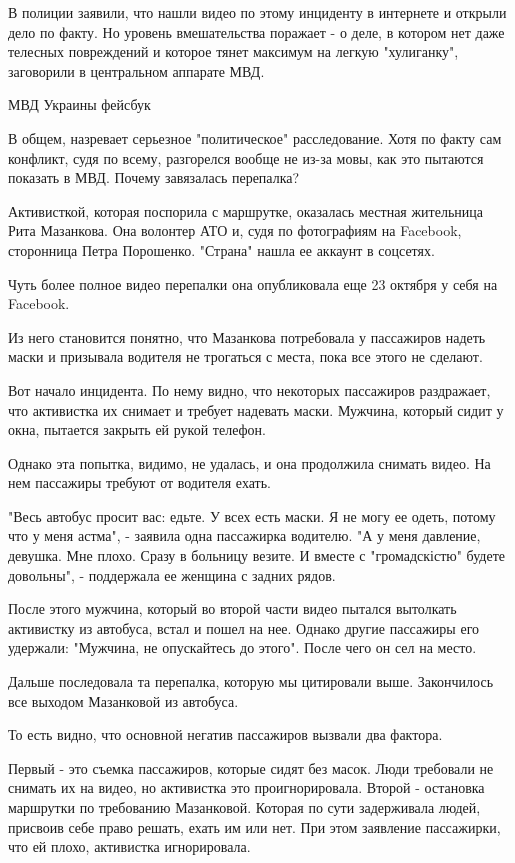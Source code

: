 В полиции заявили, что нашли видео по этому инциденту в интернете и открыли дело по факту. Но уровень вмешательства поражает - о деле, в котором нет даже телесных повреждений и которое тянет максимум на легкую "хулиганку", заговорили в центральном аппарате МВД.

МВД Украины фейсбук

В общем, назревает серьезное "политическое" расследование. Хотя по факту сам конфликт, судя по всему, разгорелся вообще не из-за мовы, как это пытаются показать в МВД. 
Почему завязалась перепалка?

Активисткой, которая поспорила с маршрутке, оказалась местная жительница Рита Мазанкова. Она волонтер АТО и, судя по фотографиям на Facebook, сторонница Петра Порошенко. "Страна" нашла ее аккаунт в соцсетях. 

Чуть более полное видео перепалки она опубликовала еще 23 октября у себя на Facebook.

Из него становится понятно, что Мазанкова потребовала у пассажиров надеть маски
и призывала водителя не трогаться с места, пока все этого не сделают.

Вот начало инцидента. По нему видно, что некоторых пассажиров раздражает, что активистка их снимает и требует надевать маски. Мужчина, который сидит у окна, пытается закрыть ей рукой телефон. 

Однако эта попытка, видимо, не удалась, и она продолжила снимать видео. На нем
пассажиры требуют от водителя ехать. 

"Весь автобус просит вас: едьте. У всех есть маски. Я не могу ее одеть, потому
что у меня астма", - заявила одна пассажирка водителю. "А у меня давление,
девушка. Мне плохо. Сразу в больницу везите. И вместе с "громадскістю" будете
довольны", - поддержала ее женщина с задних рядов. 

После этого мужчина, который во второй части видео пытался вытолкать активистку
из автобуса, встал и пошел на нее. Однако другие пассажиры его удержали:
"Мужчина, не опускайтесь до этого". После чего он сел на место. 

Дальше последовала та перепалка, которую мы цитировали выше. Закончилось все
выходом Мазанковой из автобуса. 

То есть видно, что основной негатив пассажиров вызвали два фактора.

Первый - это съемка пассажиров, которые сидят без масок. Люди требовали не
снимать их на видео, но активистка это проигнорировала. Второй - остановка
маршрутки по требованию Мазанковой. Которая по сути задерживала людей, присвоив
себе право решать, ехать им или нет. При этом заявление пассажирки, что ей
плохо, активистка игнорировала. 

